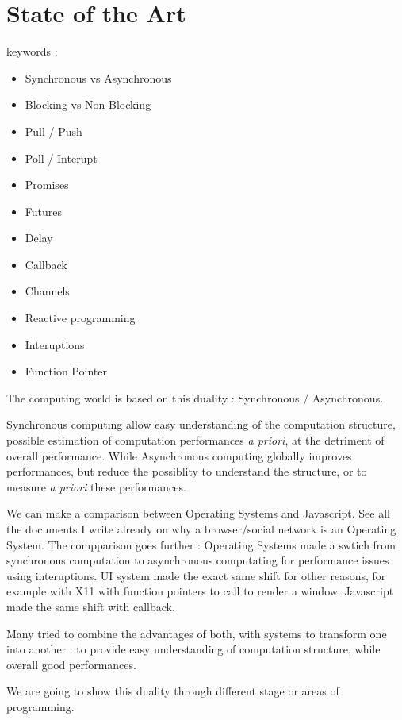 \section{State of the Art}

keywords :

\begin{itemize}
	\item Synchronous vs Asynchronous
	\item Blocking vs Non-Blocking
	\item Pull / Push
	\item Poll / Interupt

	\item Promises
	\item Futures
	\item Delay
	\item Callback
	\item Channels
	
	\item Reactive programming

	\item Interuptions
	\item Function Pointer
\end{itemize}


The computing world is based on this duality : Synchronous / Asynchronous.

Synchronous computing allow easy understanding of the computation structure, possible estimation of computation performances \textit{a priori}, at the detriment of overall performance.
While Asynchronous computing globally improves performances, but reduce the possiblity to understand the structure, or to measure \textit{a priori} these performances.

We can make a comparison between Operating Systems and Javascript.
See all the documents I write already on why a browser/social network is an Operating System.
The compparison goes further : Operating Systems made a swtich from synchronous computation to asynchronous computating for performance issues using interuptions.
UI system made the exact same shift for other reasons, for example with X11 with function pointers to call to render a window.
Javascript made the same shift with callback.


Many tried to combine the advantages of both, with systems to transform one into another : to provide easy understanding of computation structure, while overall good performances.


We are going to show this duality through different stage or areas of programming.

